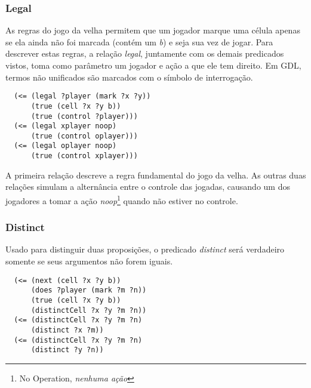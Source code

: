 \subsubsection*{Legal}
As regras do jogo da velha permitem que um jogador marque uma célula apenas se ela ainda não foi marcada (contém um \textit{b}) e seja sua vez de jogar. Para descrever estas regras, a relação \textit{legal}, juntamente com os demais predicados vistos, toma como parâmetro um jogador e ação a que ele tem direito. Em GDL, termos não unificados são marcados com o símbolo de interrogação.
\begin{verbatim}                                                                                         
  (<= (legal ?player (mark ?x ?y))                                                                       
      (true (cell ?x ?y b))                                                                              
      (true (control ?player)))       
  (<= (legal xplayer noop)                                                                               
      (true (control oplayer)))                                                                          
  (<= (legal oplayer noop)                                                                               
      (true (control xplayer)))                                                                          
\end{verbatim}
A primeira relação descreve a regra fundamental do jogo da velha. As outras duas relações simulam a alternância entre o controle das jogadas, causando um dos jogadores a tomar a ação \textit{noop}\footnote{No Operation, \textit{nenhuma ação}} quando não estiver no controle.

\subsubsection*{Distinct}
Usado para distinguir duas proposições, o predicado \textit{distinct} será verdadeiro somente se seus argumentos não forem iguais.
\begin{verbatim}                                                                                         
  (<= (next (cell ?x ?y b))                                                                              
      (does ?player (mark ?m ?n))                                                                        
      (true (cell ?x ?y b))                                                                              
      (distinctCell ?x ?y ?m ?n))                                                                        
  (<= (distinctCell ?x ?y ?m ?n)                                                                         
      (distinct ?x ?m))                                                                                                                                                
  (<= (distinctCell ?x ?y ?m ?n)                                                                         
      (distinct ?y ?n))                                                                                  
\end{verbatim}

